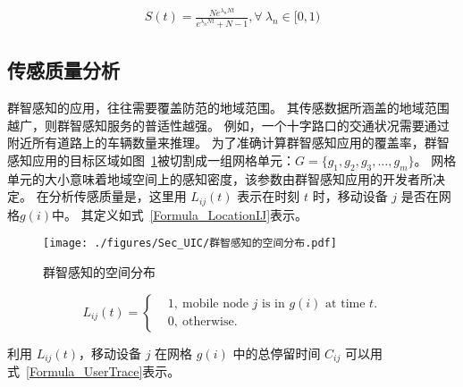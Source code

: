 \begin{equation}
\label{Formula_St}
  \begin{aligned}
    S(t) = \frac{N e^{\lambda_n N t}}{e^{\lambda_n N t} + N -1}, \forall \ \lambda_n \in [0,1)
  \end{aligned}
\end{equation}

\subsection{传感质量分析}

群智感知的应用，往往需要覆盖防范的地域范围。
其传感数据所涵盖的地域范围越广，则群智感知服务的普适性越强。
例如，一个十字路口的交通状况需要通过附近所有道路上的车辆数量来推理。
为了准确计算群智感知应用的覆盖率，群智感知应用的目标区域如图~\ref{Figure_CoverageofArea}被切割成一组网格单元：$G = \{g_1,g_2,g_3,\ldots,g_m\}$。
网格单元的大小意味着地域空间上的感知密度，该参数由群智感知应用的开发者所决定。
在分析传感质量是，这里用 $L_{ij}(t)$ 表示在时刻 $t$ 时，移动设备 $j$ 是否在网格$g(i)$中。
其定义如式~\eqref{Formula_LocationIJ}表示。

\begin{figure}[!h]
  \centering
  \texttt{[image: ./figures/Sec\_UIC/群智感知的空间分布.pdf]}
  \vspace{-0.5em}
  \caption{群智感知的空间分布}
  \vspace{-0.5em}
  \label{Figure_CoverageofArea}
\end{figure}

\begin{equation}
  \label{Formula_LocationIJ}
  L_{ij}(t) = \left \{
  \begin{aligned}
  & 1,\ \text{mobile node $j$ is in $g(i)$ at time $t$.}\\
  & 0,\ \text{otherwise.}
  \end{aligned}
  \right.
\end{equation}

利用 $L_{ij}(t)$，移动设备 $j$ 在网格 $g(i)$ 中的总停留时间 $C_{ij}$ 可以用式~\eqref{Formula_UserTrace}表示。

